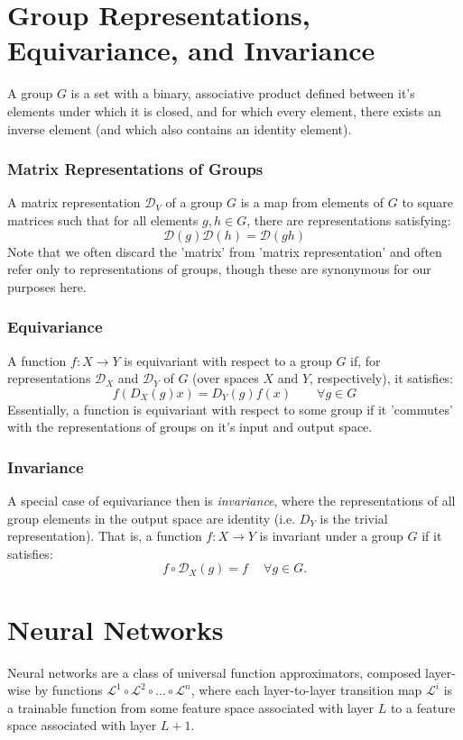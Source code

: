 \documentclass[10pt,a4paper]{article}
\begin{document}
\section{Group Representations, Equivariance, and Invariance}
A group $G$ is a set with a binary, associative product defined between it's elements under which it is closed, and for which every element, there exists an inverse element (and which also contains an identity element). 

\subsubsection*{Matrix Representations of Groups}
A matrix representation $\mathcal{D}_{V}$ of a group $G$ is a map from elements of $G$ to square matrices such that for all elements $g,h\in G$, there are representations satisfying:
$$
\mathcal{D}(g)\mathcal{D}(h)=\mathcal{D}(gh)
$$
Note that we often discard the 'matrix' from 'matrix representation' and often refer only to representations of groups, though these are synonymous for our purposes here.


\subsubsection*{Equivariance}
A function $f:X\rightarrow Y$ is equivariant with respect to a group $G$ if, for representations $\mathcal{D}_X$ and $\mathcal{D}_Y$ of $G$ (over spaces $X$ and $Y$, respectively), it satisfies:
$$
f(D_X(g)x) = D_Y(g)f(x) \quad\quad \forall g\in G
$$
Essentially, a function is equivariant with respect to some group if it 'commutes' with the representations of groups on it's input and output space. 

\subsubsection*{Invariance}
A special case of equivariance then is \textit{invariance}, where the representations of all group elements in the output space are identity (i.e. $D_Y$ is the trivial representation). That is, a function $f:X\rightarrow Y$ is invariant under a group $G$ if it satisfies:
$$
f\circ \mathcal{D}_X(g) = f \quad
\ \forall g\in G.
$$

\section{Neural Networks}
Neural networks are a class of universal function approximators, composed layer-wise by functions $\mathcal{L}^1\circ\mathcal{L}^2\circ ... \circ \mathcal{L}^n $, where each layer-to-layer transition map $\mathcal{L}^i$ is a trainable function from some feature space associated with layer $L$ to a feature space associated with layer $L+1$.
\end{document}
